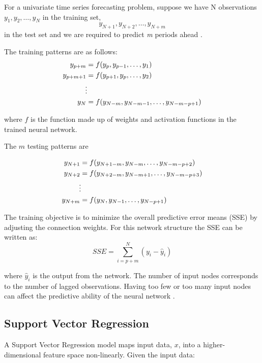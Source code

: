 For a univariate time series forecasting problem, suppose we have N observations $y_1, y_2, \ldots, y_N$ in the training set, 
\begin{equation}
y_{N+1}, y_{N+2}, \ldots, y_{N+m}
\end{equation}
\noindent in the test set and we are required to predict \textit{m} periods ahead \cite{Pao2007}. 

The training patterns are as follows:
\begin{align}
y_{p+m} & =f(y_p, y_{p-1},\ldots,y_1)\\
y_{p+m+1} & =f(y_{p+1}, y_{p},\ldots,y_2)\\
&\vdotswithin  \notag \\
y_{N} & =f(y_{N-m},y_{N-m-1},\ldots,y_{N-m-p+1})
\end{align}

\noindent where $f$ is the function made up of weights and activation functions in the trained neural network.

The $m$ testing patterns are 

\begin{align}
y_{N+1} & =f(y_{N+1-m}, y_{N-m},\ldots,y_{N-m-p+2})\\
y_{N+2} & =f(y_{N+2-m}, y_{N-m+1},\ldots,y_{N-m-p+3})\\
&\vdotswithin  \notag \\
y_{N+m} & =f(y_{N},y_{N-1},\ldots,y_{N-p+1})
\end{align}

The training objective is to minimize the overall predictive error means (SSE) by adjusting the connection weights. For this network structure the SSE can be written as:
\begin{equation}
SSE = \sum_{i=p+m}^N(y_i-\hat{y}_i)
\end{equation}

\noindent where $\hat{y}_i$ is the output from the network. The number of input nodes corresponds to the number of lagged observations. Having too few or too many input nodes can affect the predictive ability of the neural network \cite{Pao2007}.




\subsection{Support Vector Regression}

A Support Vector Regression model maps input data, $x$, into a higher-dimensional feature space non-linearly. Given the input data:

